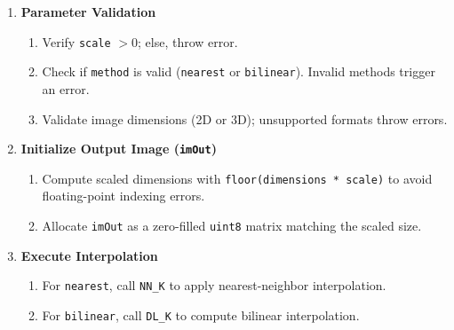 \documentclass[a4paper,11pt]{article}
\begin{document}
\begin{enumerate}
\item \textbf{Parameter Validation}
    \begin{enumerate}
        \item Verify \texttt{scale} $>0$; else, throw error.
        \item Check if \texttt{method} is valid (\texttt{nearest} or \texttt{bilinear}). Invalid methods trigger an error.
        \item Validate image dimensions (2D or 3D); unsupported formats throw errors.
    \end{enumerate}
\item \textbf{Initialize Output Image (\texttt{imOut})}
    \begin{enumerate}
        \item Compute scaled dimensions with \texttt{floor(dimensions * scale)} to avoid floating-point indexing errors.
        \item Allocate \texttt{imOut} as a zero-filled \texttt{uint8} matrix matching the scaled size.
    \end{enumerate}
\item \textbf{Execute Interpolation}
    \begin{enumerate}
        \item For \texttt{nearest}, call \texttt{NN\_K} to apply nearest-neighbor interpolation.
        \item For \texttt{bilinear}, call \texttt{DL\_K} to compute bilinear interpolation.
    \end{enumerate}
\end{enumerate}
\end{document}
